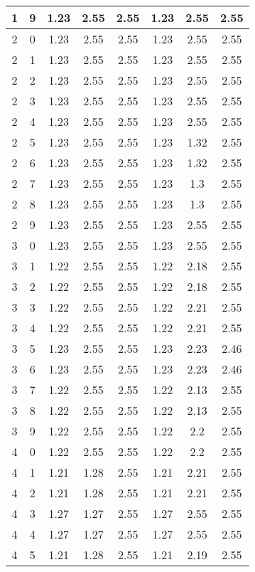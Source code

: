 \begin{longtable}{|c|c||c||c|c||c|c|c|}
	1 & 9 & 1.23 & 2.55 & 2.55 & 1.23 & 2.55 & 2.55 \\ \hline
	2 & 0 & 1.23 & 2.55 & 2.55 & 1.23 & 2.55 & 2.55 \\ \hline
	2 & 1 & 1.23 & 2.55 & 2.55 & 1.23 & 2.55 & 2.55 \\ \hline
	2 & 2 & 1.23 & 2.55 & 2.55 & 1.23 & 2.55 & 2.55 \\ \hline
	2 & 3 & 1.23 & 2.55 & 2.55 & 1.23 & 2.55 & 2.55 \\ \hline
	2 & 4 & 1.23 & 2.55 & 2.55 & 1.23 & 2.55 & 2.55 \\ \hline
	2 & 5 & 1.23 & 2.55 & 2.55 & 1.23 & 1.32 & 2.55 \\ \hline
	2 & 6 & 1.23 & 2.55 & 2.55 & 1.23 & 1.32 & 2.55 \\ \hline
	2 & 7 & 1.23 & 2.55 & 2.55 & 1.23 & 1.3 & 2.55 \\ \hline
	2 & 8 & 1.23 & 2.55 & 2.55 & 1.23 & 1.3 & 2.55 \\ \hline
	2 & 9 & 1.23 & 2.55 & 2.55 & 1.23 & 2.55 & 2.55 \\ \hline
	3 & 0 & 1.23 & 2.55 & 2.55 & 1.23 & 2.55 & 2.55 \\ \hline
	3 & 1 & 1.22 & 2.55 & 2.55 & 1.22 & 2.18 & 2.55 \\ \hline
	3 & 2 & 1.22 & 2.55 & 2.55 & 1.22 & 2.18 & 2.55 \\ \hline
	3 & 3 & 1.22 & 2.55 & 2.55 & 1.22 & 2.21 & 2.55 \\ \hline
	3 & 4 & 1.22 & 2.55 & 2.55 & 1.22 & 2.21 & 2.55 \\ \hline
	3 & 5 & 1.23 & 2.55 & 2.55 & 1.23 & 2.23 & 2.46 \\ \hline
	3 & 6 & 1.23 & 2.55 & 2.55 & 1.23 & 2.23 & 2.46 \\ \hline
	3 & 7 & 1.22 & 2.55 & 2.55 & 1.22 & 2.13 & 2.55 \\ \hline
	3 & 8 & 1.22 & 2.55 & 2.55 & 1.22 & 2.13 & 2.55 \\ \hline
	3 & 9 & 1.22 & 2.55 & 2.55 & 1.22 & 2.2 & 2.55 \\ \hline
	4 & 0 & 1.22 & 2.55 & 2.55 & 1.22 & 2.2 & 2.55 \\ \hline
	4 & 1 & 1.21 & 1.28 & 2.55 & 1.21 & 2.21 & 2.55 \\ \hline
	4 & 2 & 1.21 & 1.28 & 2.55 & 1.21 & 2.21 & 2.55 \\ \hline
	4 & 3 & 1.27 & 1.27 & 2.55 & 1.27 & 2.55 & 2.55 \\ \hline
	4 & 4 & 1.27 & 1.27 & 2.55 & 1.27 & 2.55 & 2.55 \\ \hline
	4 & 5 & 1.21 & 1.28 & 2.55 & 1.21 & 2.19 & 2.55 \\ \hline

\end{longtable}
